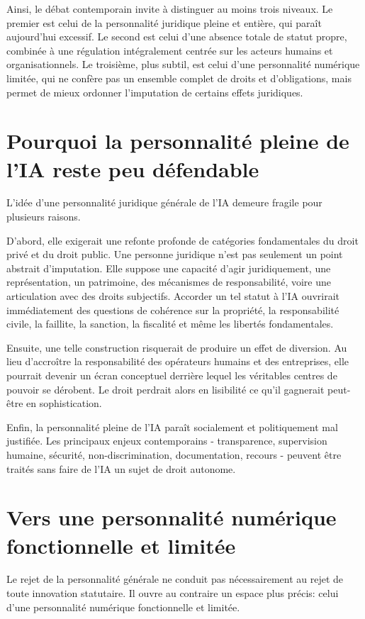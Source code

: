 \documentclass[11pt]{article}
\begin{document}
Ainsi, le débat contemporain invite à distinguer au moins trois niveaux. Le premier est celui de la personnalité juridique pleine et entière, qui paraît aujourd'hui excessif. Le second est celui d'une absence totale de statut propre, combinée à une régulation intégralement centrée sur les acteurs humains et organisationnels. Le troisième, plus subtil, est celui d'une personnalité numérique limitée, qui ne confère pas un ensemble complet de droits et d'obligations, mais permet de mieux ordonner l'imputation de certains effets juridiques.

\section{Pourquoi la personnalité pleine de l'IA reste peu défendable}
L'idée d'une personnalité juridique générale de l'IA demeure fragile pour plusieurs raisons.

D'abord, elle exigerait une refonte profonde de catégories fondamentales du droit privé et du droit public. Une personne juridique n'est pas seulement un point abstrait d'imputation. Elle suppose une capacité d'agir juridiquement, une représentation, un patrimoine, des mécanismes de responsabilité, voire une articulation avec des droits subjectifs. Accorder un tel statut à l'IA ouvrirait immédiatement des questions de cohérence sur la propriété, la responsabilité civile, la faillite, la sanction, la fiscalité et même les libertés fondamentales.

Ensuite, une telle construction risquerait de produire un effet de diversion. Au lieu d'accroître la responsabilité des opérateurs humains et des entreprises, elle pourrait devenir un écran conceptuel derrière lequel les véritables centres de pouvoir se dérobent. Le droit perdrait alors en lisibilité ce qu'il gagnerait peut-être en sophistication.

Enfin, la personnalité pleine de l'IA paraît socialement et politiquement mal justifiée. Les principaux enjeux contemporains - transparence, supervision humaine, sécurité, non-discrimination, documentation, recours - peuvent être traités sans faire de l'IA un sujet de droit autonome.

\section{Vers une personnalité numérique fonctionnelle et limitée}
Le rejet de la personnalité générale ne conduit pas nécessairement au rejet de toute innovation statutaire. Il ouvre au contraire un espace plus précis: celui d'une personnalité numérique fonctionnelle et limitée.
\end{document}
